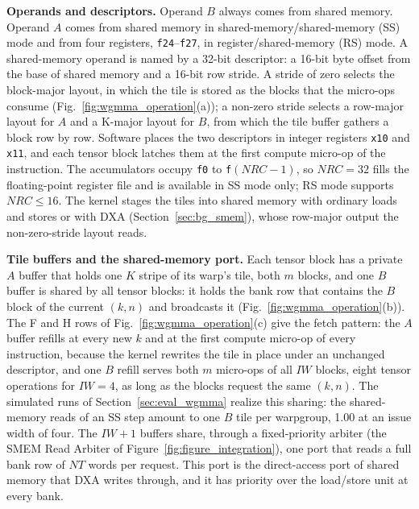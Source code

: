 \textbf{Operands and descriptors.} Operand $B$ always comes from shared memory. Operand $A$ comes from shared memory in shared-memory/shared-memory (SS) mode and from four registers, \texttt{f24}--\texttt{f27}, in register/shared-memory (RS) mode. A shared-memory operand is named by a 32-bit descriptor: a 16-bit byte offset from the base of shared memory and a 16-bit row stride. A stride of zero selects the block-major layout, in which the tile is stored as the blocks that the micro-ops consume (Fig.~\ref{fig:wgmma_operation}(a)); a non-zero stride selects a row-major layout for $A$ and a K-major layout for $B$, from which the tile buffer gathers a block row by row. Software places the two descriptors in integer registers \texttt{x10} and \texttt{x11}, and each tensor block latches them at the first compute micro-op of the instruction. The accumulators occupy \texttt{f0} to \texttt{f}$(\mathit{NRC}{-}1)$, so $\mathit{NRC}{=}32$ fills the floating-point register file and is available in SS mode only; RS mode supports $\mathit{NRC}\le 16$. The kernel stages the tiles into shared memory with ordinary loads and stores or with DXA (Section~\ref{sec:bg_smem}), whose row-major output the non-zero-stride layout reads.

\textbf{Tile buffers and the shared-memory port.} Each tensor block has a private $A$ buffer that holds one $K$ stripe of its warp's tile, both $m$ blocks, and one $B$ buffer is shared by all tensor blocks: it holds the bank row that contains the $B$ block of the current $(k,n)$ and broadcasts it (Fig.~\ref{fig:wgmma_operation}(b)). The F and H rows of Fig.~\ref{fig:wgmma_operation}(c) give the fetch pattern: the $A$ buffer refills at every new $k$ and at the first compute micro-op of every instruction, because the kernel rewrites the tile in place under an unchanged descriptor, and one $B$ refill serves both $m$ micro-ops of all $\mathit{IW}$ blocks, eight tensor operations for $\mathit{IW}{=}4$, as long as the blocks request the same $(k,n)$. The simulated runs of Section~\ref{sec:eval_wgmma} realize this sharing: the shared-memory reads of an SS step amount to one $B$ tile per warpgroup, 1.00 at an issue width of four. The $\mathit{IW}{+}1$ buffers share, through a fixed-priority arbiter (the SMEM Read Arbiter of Figure~\ref{fig:figure_integration}), one port that reads a full bank row of $\mathit{NT}$ words per request. This port is the direct-access port of shared memory that DXA writes through, and it has priority over the load/store unit at every bank.

